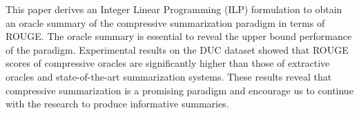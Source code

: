 This paper derives an Integer Linear Programming (ILP) formulation to obtain an oracle summary of the compressive summarization paradigm in terms of ROUGE. The oracle summary is essential to reveal the upper bound performance of the paradigm. Experimental results on the DUC dataset showed that ROUGE scores of compressive oracles are significantly higher than those of extractive oracles and state-of-the-art summarization systems. These results reveal that compressive summarization is a promising  paradigm and encourage us to continue with the research to produce informative summaries.
